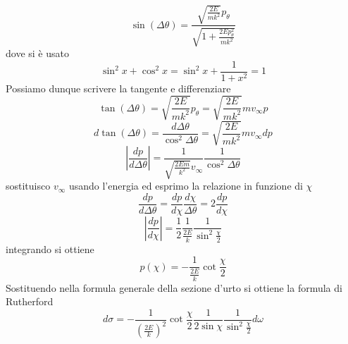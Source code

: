 \documentclass[
10pt, %
a4paper, %
oneside, %
headinclude,footinclude, %
BCOR5mm, %
]{scrartcl}
\begin{document}
\[\sin(\Delta\theta)  = \frac{\sqrt{\frac{2E}{mk^2}}p_\theta}{\sqrt{1+\frac{2Ep_\theta^2}{mk^2}}}\]
dove si è usato
\[\sin^2x+\cos^2x = \sin^2x+\frac{1}{1+x^2} = 1\]
Possiamo dunque scrivere la tangente e differenziare
\[\tan(\Delta\theta) = \sqrt{\frac{2E}{mk^2}}p_\theta = \sqrt{\frac{2E}{mk^2}}mv_\infty p\]
\[d\tan(\Delta\theta) = \frac{d\Delta\theta}{\cos^2\Delta\theta} = \sqrt{\frac{2E}{mk^2}}mv_\infty dp\]
\[|\frac{dp}{d\Delta\theta}| =\frac{1}{\sqrt{\frac{2Em}{k^2}}v_\infty}\frac{1}{\cos^2\Delta\theta}\]
sostituisco \(v_\infty\) usando l'energia ed esprimo la relazione in funzione di $\chi$
\[\frac{dp}{d\Delta\theta} = \frac{dp}{d\chi}\frac{d\chi}{\Delta\theta} = 2\frac{dp}{d\chi}\]
\[|\frac{dp}{d\chi}| =\frac{1}{2}\frac{1}{\frac{2E}{k}}\frac{1}{\sin^2\frac{\chi}{2}}\]
integrando si ottiene 
\[p(\chi) = -\frac{1}{\frac{2E}{k}}\cot\frac{\chi}{2}\]
Sostituendo nella formula generale della sezione d'urto si ottiene la formula di Rutherford
\[d\sigma = -\frac{1}{\left(\frac{2E}{k}\right)^2}\cot\frac{\chi}{2}\frac{1}{2\sin\chi}\frac{1}{\sin^2\frac{\chi}{2}}d\omega \]


\newpage
\end{document}
